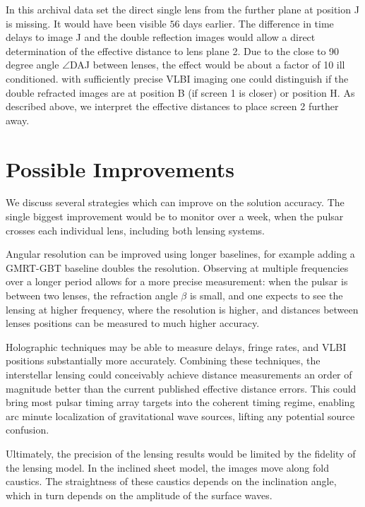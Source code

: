 \documentclass[useAMS,usenatbib]{mn2e}
\begin{document}
In this archival data set the direct single lens from the further
plane at position J is missing.  It would have been visible $56$ days
earlier. The difference in time delays to image J and the double
reflection images would allow a direct determination of the effective
distance to lens plane 2.  Due to the close to 90 degree angle $\angle$DAJ
between lenses, the effect would be about a factor of 10 ill
conditioned.  with sufficiently precise VLBI imaging one could
distinguish if the double refracted images are at position B (if
screen 1 is closer) or position H.  As described above, we interpret
the effective distances to place screen 2 further away.

\section{Possible Improvements}

We discuss several strategies which can improve on the solution
accuracy.  The single biggest improvement would be to monitor over a
week, when the pulsar crosses each individual lens, including both
lensing systems.

Angular resolution can be improved using longer baselines, for example
adding a GMRT-GBT baseline doubles the resolution.  Observing at
multiple frequencies over a longer period allows for a more precise
measurement: when the pulsar is between two lenses, the refraction
angle $\beta$ is small, and one expects to see the lensing at higher
frequency, where the resolution is higher, and distances between
lenses positions can be measured to much higher accuracy.

Holographic techniques \citep{2008MNRAS.388.1214W,2014MNRAS.440L..36P}
may be able to measure delays, fringe rates, and VLBI positions
substantially more accurately.  Combining these techniques, the
interstellar lensing could conceivably achieve distance measurements
an order of magnitude better than the current published effective
distance errors.  This could bring most pulsar timing array targets
into the coherent timing regime, enabling arc minute localization of
gravitational wave sources, lifting any potential source confusion.

Ultimately, the precision of the lensing results would be limited by
the fidelity of the lensing model.  In the inclined sheet model, the
images move along fold caustics.  The straightness of these caustics
depends on the inclination angle, which in turn depends on the
amplitude of the surface waves.  
\end{document}
